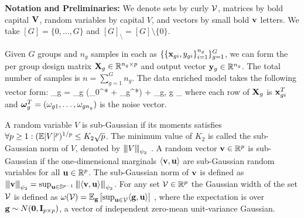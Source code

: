 {\bf Notation and Preliminaries:}
We denote sets by curly ${\cal V}$, matrices by bold capital $\mathbf{V}$, random variables by capital $V$, and vectors by small bold $\mathbf{v}$ letters.
We take $[G] = \{0, \dots, G\}$ and $[G]_\setminus = [G] \setminus \{0\}$.

Given $G$ groups and $n_g$ samples in each as $\{ \{\mathbf{x}_{gi}, y_{gi} \}_{i=1}^{n_g} \}_{g = 1}^G$, we can form the per group design matrix $\mathbf{X}_g \in \mathbb R^{n_g \times p}$ and output vector $\mathbf{y}_g \in \mathbb R ^{n_g}$.
The total number of samples is  $n = \sum_{g = 1}^{G} n_g$.
The data enriched model takes the following vector form:
\be
\label{eq:dirtymodel}
\y_g = \X_g (\bbeta _0^* + \bbeta _g^*) + \oomega_g,  \quad \forall g \in [G]_\setminus
\ee
where each row of $\mathbf{X}_g$ is $\mathbf{x}_{gi}^T$ and $\boldsymbol{\omega}_g^T = (\omega_{g1}, \dots, \omega_{gn_g})$ is the noise vector.

A random variable $V$ is sub-Gaussian if its moments satisfies $\forall p \geq 1: (\mathbb{E} |V|^p )^{1/p} \leq K_2 \sqrt{p}$.
The minimum value of $K_2$ is called the sub-Gaussian  norm of $V$, denoted by ${\left\vert\kern-0.25ex\left\vert\kern-0.25ex\left\vert V \right\vert\kern-0.25ex\right\vert\kern-0.25ex\right\vert}_{\psi_2}$ \cite{vers12}.
A random vector $\mathbf{v} \in \mathbb R^p$ is sub-Gaussian if the one-dimensional marginals $\langle \mathbf{v}, \mathbf{u} \rangle$ are sub-Gaussian random variables for all $\mathbf{u} \in \mathbb R^p$. The sub-Gaussian norm of $\mathbf{v}$ is defined \cite{vers12} as ${\left\vert\kern-0.25ex\left\vert\kern-0.25ex\left\vert \mathbf{v} \right\vert\kern-0.25ex\right\vert\kern-0.25ex\right\vert}_{\psi_2} = \sup_{\mathbf{u} \in \mathbb S^{p-1}} {\left\vert\kern-0.25ex\left\vert\kern-0.25ex\left\vert \langle \mathbf{v}, \mathbf{u} \rangle \right\vert\kern-0.25ex\right\vert\kern-0.25ex\right\vert}_{\psi_2}$.
For any set ${\cal V} \in \mathbb R^p$ the Gaussian width of the set ${\cal V}$ is defined as $\omega({\cal V}) = \mathbb{E}_{\mathbf{g}} \left[ \sup_{\mathbf{u} \in {\cal V}} \langle \mathbf{g}, \mathbf{u} \rangle \right]$ \cite{venkat12},  where the expectation is over $\mathbf{g} \sim N(\mathbf{0}, \mathbf{I}_{p \times p})$, a vector of independent zero-mean unit-variance Gaussian.

